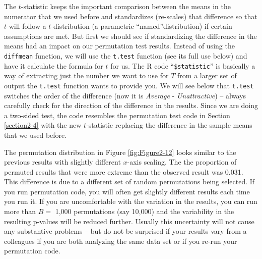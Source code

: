 \documentclass[]{book}
\newenvironment{Shaded}{\begin{snugshade}}{\end{snugshade}}
\newcommand{\KeywordTok}[1]{\textcolor[rgb]{0.13,0.29,0.53}{\textbf{#1}}}
\newcommand{\DataTypeTok}[1]{\textcolor[rgb]{0.13,0.29,0.53}{#1}}
\newcommand{\StringTok}[1]{\textcolor[rgb]{0.31,0.60,0.02}{#1}}
\newcommand{\OperatorTok}[1]{\textcolor[rgb]{0.81,0.36,0.00}{\textbf{#1}}}
\newcommand{\NormalTok}[1]{#1}
\begin{document}
The \(t\)-statistic keeps the important comparison between the means in
the numerator that we used before and standardizes (re-scales) that
difference so that \(t\) will follow a \(t\)-distribution (a parametric
``named''distribution) if certain assumptions are met. But first we
should see if standardizing the difference in the means had an impact on
our permutation test results. Instead of using the \texttt{diffmean}
function, we will use the \texttt{t.test} function (see its full use
below) and have it calculate the formula for \(t\) for us. The R code
``\texttt{\$statistic}'' is basically a way of extracting just the
number we want to use for \(T\) from a larger set of output the
\texttt{t.test} function wants to provide you. We will see below that
\texttt{t.test} switches the order of the difference (now it is
\emph{Average} - \emph{Unattractive}) -- always carefully check for the
direction of the difference in the results. Since we are doing a
two-sided test, the code resembles the permutation test code in Section
\ref{section2-4} with the new \(t\)-statistic replacing the difference
in the sample means that we used before.

The permutation distribution in Figure \ref{fig:Figure2-12} looks
similar to the previous results with slightly different \(x\)-axis
scaling. The the proportion of permuted results that were more extreme
than the observed result was 0.031. This difference is due to a
different set of random permutations being selected. If you run
permutation code, you will often get slightly different results each
time you run it. If you are uncomfortable with the variation in the
results, you can run more than \(B=\) 1,000 permutations (say 10,000)
and the variability in the resulting p-values will be reduced further.
Usually this uncertainty will not cause any substantive problems -- but
do not be surprised if your results vary from a colleagues if you are
both analyzing the same data set or if you re-run your permutation code.



\begin{Shaded}
\end{Shaded}
\end{document}
